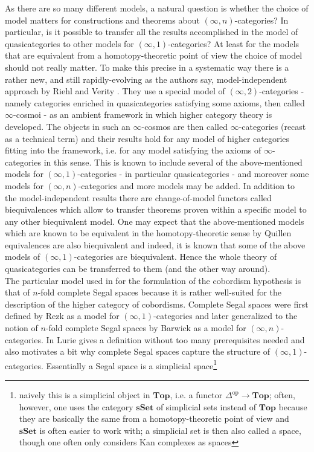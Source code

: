 As there are so many different models, a natural question is whether the choice of model matters for constructions and theorems about $(\infty,n)$-categories? In particular, is it possible to transfer all the results accomplished in the model of quasicategories to other models for $(\infty,1)$-categories? At least for the models that are equivalent from a homotopy-theoretic point of view the choice of model should not really matter. To make this precise in a systematic way there is a rather new, and still rapidly-evolving as the authors say, {\glqq}model-independent{\grqq} approach by Riehl and Verity \cite{53e76732}. They use a special model of $(\infty,2)$-categories - namely categories enriched in quasicategories satisfying some axioms, then called $\infty$-cosmoi - as an ambient framework in which higher category theory is developed. The objects in such an $\infty$-cosmos are then called $\infty$-categories (recast as a technical term) and their results hold for any model of higher categories fitting into the framework, i.e. for any model satisfying the axioms of $\infty$-categories in this sense. This is known to include several of the above-mentioned models for $(\infty,1)$-categories - in particular quasicategories - and moreover some models for $(\infty,n)$-categories and more models may be added. In addition to the model-independent results there are {\glqq}change-of-model{\grqq} functors called biequivalences which allow to transfer theorems proven within a specific model to any other biequivalent model. One may expect that the above-mentioned models which are known to be equivalent in the homotopy-theoretic sense by Quillen equivalences are also biequivalent and indeed, it is known that some of the above models of $(\infty,1)$-categories are biequivalent. Hence the whole theory of quasicategories can be transferred to them (and the other way around).
\\
The particular model used in \cite{dfcdc48c} for the formulation of the cobordism hypothesis is that of $n$-fold complete Segal spaces because it is rather well-suited for the description of the higher category of cobordisms. Complete Segal spaces were first defined by Rezk as a model for $(\infty,1)$-categories and later generalized to the notion of $n$-fold complete Segal spaces by Barwick as a model for $(\infty,n)$-categories. In \cite{dfcdc48c} Lurie gives a definition without too many prerequisites needed and also motivates a bit why complete Segal spaces capture the structure of $(\infty,1)$-categories. Essentially a Segal space is a simplicial space\footnote{naively this is a simplicial object in $\mathbf{Top}$, i.e. a functor $\Delta^{\mathrm{op}} \to \mathbf{Top}$; often, however, one uses the category $\mathbf{sSet}$ of simplicial sets instead of $\mathbf{Top}$ because they are basically the same from a homotopy-theoretic point of view and $\mathbf{sSet}$ is often easier to work with; a simplicial set is then also called a space, though one often only considers Kan complexes as spaces}
